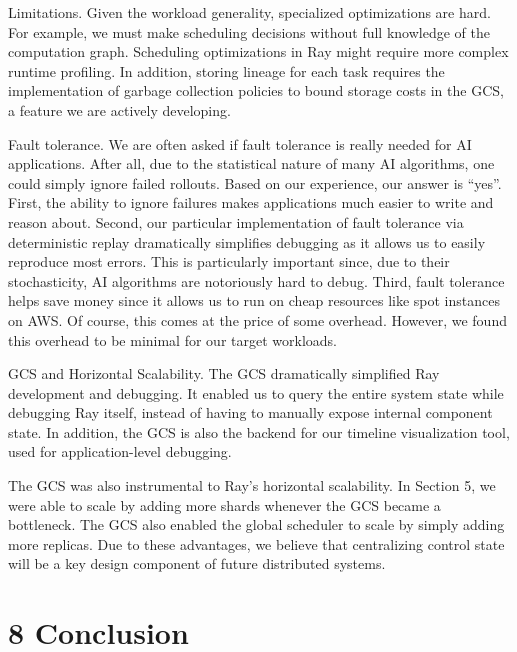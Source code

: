 \documentclass[
]{article}
\begin{document}
Limitations. Given the workload generality, specialized optimizations
are hard. For example, we must make scheduling decisions without full
knowledge of the computation graph. Scheduling optimizations in Ray
might require more complex runtime profiling. In addition, storing
lineage for each task requires the implementation of garbage collection
policies to bound storage costs in the GCS, a feature we are actively
developing.

Fault tolerance. We are often asked if fault tolerance is really needed
for AI applications. After all, due to the statistical nature of many AI
algorithms, one could simply ignore failed rollouts. Based on our
experience, our answer is ``yes''. First, the ability to ignore failures
makes applications much easier to write and reason about. Second, our
particular implementation of fault tolerance via deterministic replay
dramatically simplifies debugging as it allows us to easily reproduce
most errors. This is particularly important since, due to their
stochasticity, AI algorithms are notoriously hard to debug. Third, fault
tolerance helps save money since it allows us to run on cheap resources
like spot instances on AWS. Of course, this comes at the price of some
overhead. However, we found this overhead to be minimal for our target
workloads.

GCS and Horizontal Scalability. The GCS dramatically simplified Ray
development and debugging. It enabled us to query the entire system
state while debugging Ray itself, instead of having to manually expose
internal component state. In addition, the GCS is also the backend for
our timeline visualization tool, used for application-level debugging.

The GCS was also instrumental to Ray's horizontal scalability. In
Section 5, we were able to scale by adding more shards whenever the GCS
became a bottleneck. The GCS also enabled the global scheduler to scale
by simply adding more replicas. Due to these advantages, we believe that
centralizing control state will be a key design component of future
distributed systems.

\section{8 Conclusion}\label{conclusion}
\end{document}
